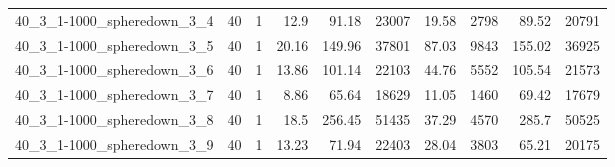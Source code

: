 \begin{center}
\begin{scriptsize}
\begin{longtable}{lrrrrrrrrr}
40\_3\_1-1000\_spheredown\_3\_4 & 40 & 1 & 12.9 & 91.18 & 23007 & 19.58 & 2798 & 89.52 & 20791\\
40\_3\_1-1000\_spheredown\_3\_5 & 40 & 1 & 20.16 & 149.96 & 37801 & 87.03 & 9843 & 155.02 & 36925\\
40\_3\_1-1000\_spheredown\_3\_6 & 40 & 1 & 13.86 & 101.14 & 22103 & 44.76 & 5552 & 105.54 & 21573\\
40\_3\_1-1000\_spheredown\_3\_7 & 40 & 1 & 8.86 & 65.64 & 18629 & 11.05 & 1460 & 69.42 & 17679\\
40\_3\_1-1000\_spheredown\_3\_8 & 40 & 1 & 18.5 & 256.45 & 51435 & 37.29 & 4570 & 285.7 & 50525\\
40\_3\_1-1000\_spheredown\_3\_9 & 40 & 1 & 13.23 & 71.94 & 22403 & 28.04 & 3803 & 65.21 & 20175\\
\bottomrule
\end{longtable}
\end{scriptsize}
\end{center}

